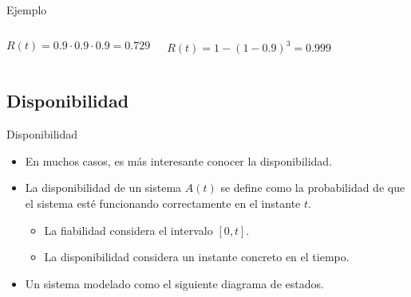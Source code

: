 \begin{frame}[t]{Ejemplo}
\begin{center}

\end{center}

\begin{columns}[T]







\end{columns}

\begin{columns}[T]


\begin{equation*}
R(t) = 0.9 \cdot 0.9 \cdot 0.9 = 0.729
\end{equation*}


\begin{equation*}
R(t) = 1 - (1 - 0.9)^3 = 0.999
\end{equation*}

\end{columns}

\end{frame}

\subsection{Disponibilidad}

\begin{frame}[t]{Disponibilidad}
\begin{itemize}
  \item En muchos casos, es más interesante conocer la disponibilidad.
  \item La disponibilidad de un sistema $A(t)$ se define como
        la probabilidad de que el sistema esté funcionando correctamente
        en el instante $t$.
    \begin{itemize}
      \item La fiabilidad considera el intervalo $[0,t]$.
      \item La disponibilidad considera un instante concreto en el tiempo.
    \end{itemize}
  \item Un sistema modelado como el siguiente diagrama de estados.
\end{itemize}
\begin{center}

\end{center}
\end{frame}

